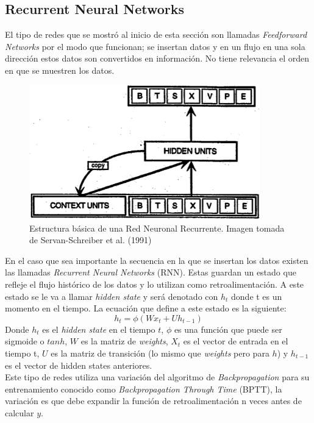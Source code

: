 \documentclass[12pt,spanish]{article}
\begin{document}
	\subsection{Recurrent Neural Networks}
	El tipo de redes que se mostró al inicio de esta sección son llamadas \textit{Feedforward Networks} por el modo que funcionan; se insertan datos y en un flujo en una sola dirección estos datos son convertidos en información. No tiene relevancia el orden en que se muestren los datos.\\
	\begin{figure}[H]
		\centering
		\includegraphics[width=10cm]{Imagenes/rnn_structure.png}
		\begin{centering}
			\caption{Estructura básica de una Red Neuronal Recurrente. Imagen tomada de  Servan-Schreiber et al. (1991)}
		\end{centering}
	\end{figure}
	En el caso que sea importante la secuencia en la que se insertan los datos existen las llamadas \textit{Recurrent Neural Networks} (RNN). Estas guardan un estado que refleje el flujo histórico de los datos y lo utilizan como retroalimentación. A este estado se le va a llamar \textit{hidden state} y será denotado con $h_t$ donde t es un momento en el tiempo. La ecuación que define a este estado es la siguiente:
	\[ h_t = \phi (Wx_t + Uh_{t-1}) \]
	Donde $h_t$ es el \textit{hidden state} en el tiempo $t$, $\phi$ es una función que puede ser sigmoide o $tanh$, $W$ es la matriz de \textit{weights}, $X_t$ es el vector de entrada en el tiempo t, $U$ es la matriz de transición (lo mismo que \textit{weights} pero para $h$) y $h_{t-1}$ es el vector de hidden states anteriores. \\
	Este tipo de redes utiliza una variación del algoritmo de \textit{Backpropagation} para su entrenamiento conocido como \textit{Backpropagation Through Time} (BPTT), la variación es que debe expandir la función de retroalimentación n veces antes de calcular $y$.
\end{document}
